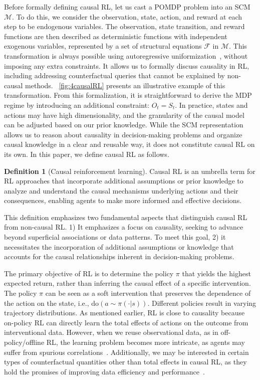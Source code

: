 \documentclass[10pt]{article} %
\theoremstyle{definition}
\newtheorem{definition}{Definition}[section]
\begin{document}
Before formally defining causal RL, let us cast a POMDP problem into an SCM $\mathcal{M}$. To do this, we consider the observation, state, action, and reward at each step to be endogenous variables. The observation, state transition, and reward functions are then described as deterministic functions with independent exogenous variables, represented by a set of structural equations $\mathcal{F}$ in $\mathcal{M}$. This transformation is always possible using autoregressive uniformization~\citep{buesingWouldaCouldaShoulda2019a}, without imposing any extra constraints. It allows us to formally discuss causality in RL, including addressing counterfactual queries that cannot be explained by non-causal methods. \figurename~\ref{fig:4causalRL} presents an illustrative example of this transformation. From this formalization, it is straightforward to derive the MDP regime by introducing an additional constraint: $O_t = S_t$.
In practice, states and actions may have high dimensionality, and the granularity of the causal model can be adjusted based on our prior knowledge. While the SCM representation allows us to reason about causality in decision-making problems and organize causal knowledge in a clear and reusable way, it does not constitute causal RL on its own. In this paper, we define causal RL as follows. 
\begin{definition}[Causal reinforcement learning]
\label{def:causal_rl}
Causal RL is an umbrella term for RL approaches that incorporate additional assumptions or prior knowledge to analyze and understand the causal mechanisms underlying actions and their consequences, enabling agents to make more informed and effective decisions.
\end{definition}
This definition emphasizes two fundamental aspects that distinguish causal RL from non-causal RL. 1) It emphasizes a focus on causality, seeking to advance beyond superficial associations or data patterns. To meet this goal, 2) it necessitates the incorporation of additional assumptions or knowledge that accounts for the causal relationships inherent in decision-making problems.

The primary objective of RL is to determine the policy $\pi$ that yields the highest expected return, rather than inferring the causal effect of a specific intervention. 
The policy $\pi$ can be seen as a soft intervention that preserves the dependence of the action on the state, i.e., $\mbox{do}(a \sim \pi(\cdot | s))$. Different policies result in varying trajectory distributions. 
As mentioned earlier, RL is close to causality because on-policy RL can directly learn the total effects of actions on the outcome from interventional data. 
However, when we reuse observational data, as in off-policy/offline RL, the learning problem becomes more intricate, as agents may suffer from spurious correlations~\citep{zhangCausalImitationLearning2020a,dengSCORESpuriousCOrrelation2021a}. 
Additionally, we may be interested in certain types of counterfactual quantities other than total effects in causal RL, as they hold the promises of improving data efficiency and performance~\citep{bareinboimBanditsUnobservedConfounders2015a,buesingWouldaCouldaShoulda2019a,luSampleEfficientReinforcementLearning2020a}. 
\end{document}
